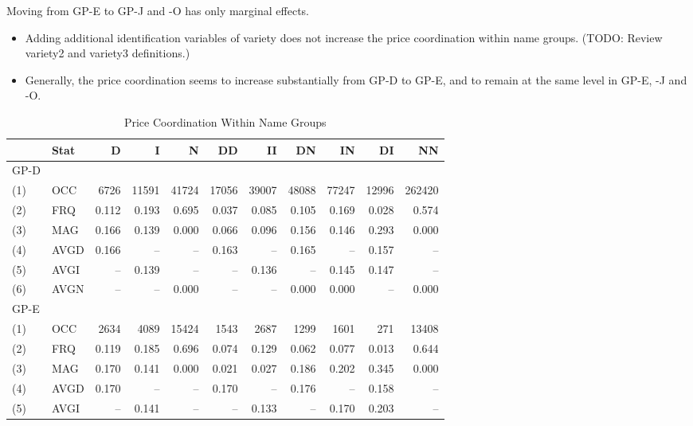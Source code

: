 Moving from GP-E to GP-J and -O has only marginal effects.
\begin{itemize}
	\item Adding additional identification variables of variety does not increase the price coordination within name groups. (TODO: Review variety2 and variety3 definitions.)
	\item Generally, the price coordination seems to increase substantially from GP-D to GP-E, and to remain at the same level in GP-E, -J and -O.
\end{itemize}

\begin{table}[H]
	\caption{Price Coordination Within Name Groups}\label{tbl1}
	\begin{tabular}{llrrrrrrrrr}
		\hline\hline
		& Stat &     D &     I &     N &    DD &    II &    DN &    IN &    DI &     NN \\ \hline\hline
		GP-D &      &       &       &       &       &       &       &       &       &        \\
		(1)  & OCC  &  6726 & 11591 & 41724 & 17056 & 39007 & 48088 & 77247 & 12996 & 262420 \\
		(2)  & FRQ  & 0.112 & 0.193 & 0.695 & 0.037 & 0.085 & 0.105 & 0.169 & 0.028 &  0.574 \\
		(3)  & MAG  & 0.166 & 0.139 & 0.000 & 0.066 & 0.096 & 0.156 & 0.146 & 0.293 &  0.000 \\
		(4)  & AVGD & 0.166 &    -- &    -- & 0.163 &    -- & 0.165 &    -- & 0.157 &     -- \\
		(5)  & AVGI &    -- & 0.139 &    -- &    -- & 0.136 &    -- & 0.145 & 0.147 &     -- \\
		(6)  & AVGN &    -- &    -- & 0.000 &    -- &    -- & 0.000 & 0.000 &    -- &  0.000 \\ \hline
		GP-E &      &       &       &       &       &       &       &       &       &        \\
		(1)  & OCC  &  2634 &  4089 & 15424 &  1543 &  2687 &  1299 &  1601 &   271 &  13408 \\
		(2)  & FRQ  & 0.119 & 0.185 & 0.696 & 0.074 & 0.129 & 0.062 & 0.077 & 0.013 &  0.644 \\
		(3)  & MAG  & 0.170 & 0.141 & 0.000 & 0.021 & 0.027 & 0.186 & 0.202 & 0.345 &  0.000 \\
		(4)  & AVGD & 0.170 &    -- &    -- & 0.170 &    -- & 0.176 &    -- & 0.158 &     -- \\
		(5)  & AVGI &    -- & 0.141 &    -- &    -- & 0.133 &    -- & 0.170 & 0.203 &     -- \\

\end{tabular}
\end{table}
